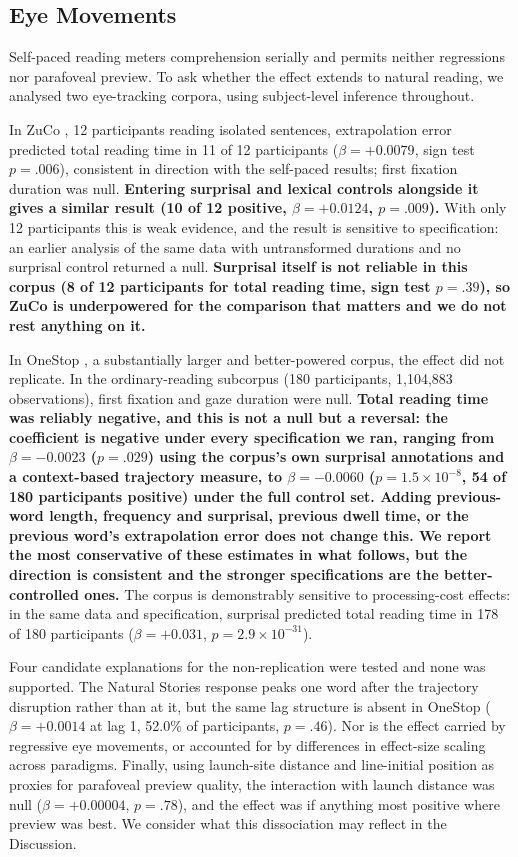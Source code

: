 \documentclass[12pt]{article}
\newcommand{\new}[1]{{\bfseries #1}}
\begin{document}
\new{\subsection{Eye Movements}

Self-paced reading meters comprehension serially and permits neither regressions nor parafoveal preview. To ask whether the effect extends to natural reading, we analysed two eye-tracking corpora, using subject-level inference throughout.

In ZuCo \citep{hollenstein2018}, 12 participants reading isolated sentences, extrapolation error predicted total reading time in 11 of 12 participants ($\beta = +0.0079$, sign test $p = .006$), consistent in direction with the self-paced results; first fixation duration was null. \new{Entering surprisal and lexical controls alongside it gives a similar result (10 of 12 positive, $\beta = +0.0124$, $p = .009$).} With only 12 participants this is weak evidence, and the result is sensitive to specification: an earlier analysis of the same data with untransformed durations and no surprisal control returned a null. \new{Surprisal itself is not reliable in this corpus (8 of 12 participants for total reading time, sign test $p = .39$), so ZuCo is underpowered for the comparison that matters and we do not rest anything on it.}

In OneStop \citep{berzak2025}, a substantially larger and better-powered corpus, the effect did not replicate. In the ordinary-reading subcorpus (180 participants, 1,104,883 observations), first fixation and gaze duration were null. \new{Total reading time was reliably negative, and this is not a null but a reversal: the coefficient is negative under every specification we ran, ranging from $\beta = -0.0023$ ($p = .029$) using the corpus's own surprisal annotations and a context-based trajectory measure, to $\beta = -0.0060$ ($p = 1.5 \times 10^{-8}$, 54 of 180 participants positive) under the full control set. Adding previous-word length, frequency and surprisal, previous dwell time, or the previous word's extrapolation error does not change this. We report the most conservative of these estimates in what follows, but the direction is consistent and the stronger specifications are the better-controlled ones.} The corpus is demonstrably sensitive to processing-cost effects: in the same data and specification, surprisal predicted total reading time in 178 of 180 participants ($\beta = +0.031$, $p = 2.9 \times 10^{-31}$).

Four candidate explanations for the non-replication were tested and none was supported. The Natural Stories response peaks one word after the trajectory disruption rather than at it, but the same lag structure is absent in OneStop ($\beta = +0.0014$ at lag 1, 52.0\% of participants, $p = .46$). Nor is the effect carried by regressive eye movements, or accounted for by differences in effect-size scaling across paradigms. Finally, using launch-site distance and line-initial position as proxies for parafoveal preview quality, the interaction with launch distance was null ($\beta = +0.00004$, $p = .78$), and the effect was if anything most positive where preview was best. We consider what this dissociation may reflect in the Discussion.}
\end{document}
